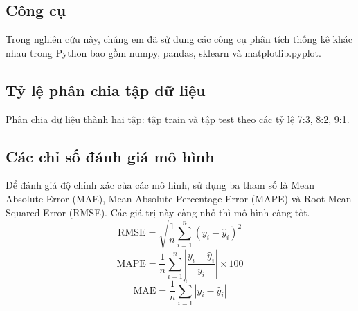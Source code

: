 \subsection{Công cụ}
Trong nghiên cứu này, chúng em đã sử dụng các công cụ phân tích thống kê khác nhau trong Python bao gồm numpy, pandas, sklearn và matplotlib.pyplot.

\subsection{Tỷ lệ phân chia tập dữ liệu}
Phân chia dữ liệu thành hai tập: tập train và tập test theo các tỷ lệ 7:3, 8:2, 9:1. %

\subsection{Các chỉ số đánh giá mô hình}
Để đánh giá độ chính xác của các mô hình, sử dụng ba tham số là Mean Absolute Error (MAE), Mean Absolute Percentage Error (MAPE) và Root Mean Squared Error (RMSE). Các giá trị này càng nhỏ thì mô hình càng tốt.
\[
\text{RMSE} = \sqrt{\frac{1}{n} \sum_{i=1}^{n} (y_i - \hat{y}_i)^2}
\]
\[
\text{MAPE} = \frac{1}{n} \sum_{i=1}^{n} \left| \frac{y_i - \hat{y}_i}{y_i} \right| \times 100
\]
\[
\text{MAE} = \frac{1}{n} \sum_{i=1}^{n} |y_i - \hat{y}_i|
\]